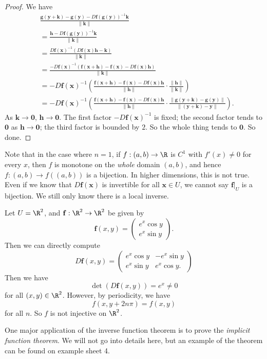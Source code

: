\documentclass[a4paper]{article}
\begin{document}
\begin{proof}
  We have
  \begin{align*}
    &\frac{\mathbf{g}(\mathbf{y} + \mathbf{k}) - \mathbf{g}(\mathbf{y}) - D \mathbf{f}(\mathbf{g}(\mathbf{y}))^{-1} \mathbf{k}}{\|\mathbf{k}\|}\\
    &= \frac{\mathbf{h} - D\mathbf{f}(\mathbf{g}(\mathbf{y}))^{-1} \mathbf{k}}{\|\mathbf{k}\|}\\
    &= \frac{D \mathbf{f}(\mathbf{x})^{-1}(D \mathbf{f}(\mathbf{x})\mathbf{h} - \mathbf{k})}{\|\mathbf{k}\|}\\
    &= \frac{-D \mathbf{f}(\mathbf{x})^{-1}(\mathbf{f}(\mathbf{x} + \mathbf{h}) - \mathbf{f}(\mathbf{x}) - D \mathbf{f}(\mathbf{x})\mathbf{h})}{\|\mathbf{k}\|}\\
    &= -D \mathbf{f}(\mathbf{x})^{-1} \left(\frac{\mathbf{f}(\mathbf{x} + \mathbf{h}) - \mathbf{f}(\mathbf{x}) - D \mathbf{f}(\mathbf{x}) \mathbf{\mathbf{h}}}{\|\mathbf{h}\|} \cdot \frac{\|\mathbf{h}\|}{\|\mathbf{k}\|}\right)\\
    &= -D \mathbf{f}(\mathbf{x})^{-1} \left(\frac{\mathbf{f}(\mathbf{x} + \mathbf{h}) - \mathbf{f}(\mathbf{x}) - D \mathbf{f}(\mathbf{x}) \mathbf{\mathbf{h}}}{\|\mathbf{h}\|} \cdot \frac{\|\mathbf{g}(\mathbf{y} + \mathbf{k}) - \mathbf{g}(\mathbf{y})\|}{\|(\mathbf{y} + \mathbf{k}) - \mathbf{y}\|}\right).
  \end{align*}
  As $\mathbf{k} \to \mathbf{0}$, $\mathbf{h} \to \mathbf{0}$. The first factor $-D \mathbf{f}(\mathbf{x})^{-1}$ is fixed; the second factor tends to $\mathbf{0}$ as $\mathbf{h} \to \mathbf{0}$; the third factor is bounded by $2$. So the whole thing tends to $\mathbf{0}$. So done.
\end{proof}
Note that in the case where $n = 1$, if $f: (a, b) \to \R$ is $C^1$ with $f'(x) \not= 0$ for every $x$, then $f$ is monotone on the \emph{whole} domain $(a, b)$, and hence $f: (a, b) \to f((a, b))$ is a bijection. In higher dimensions, this is not true. Even if we know that $D \mathbf{f}(\mathbf{x})$ is invertible for all $\mathbf{x} \in U$, we cannot say $\mathbf{f}|_U$ is a bijection. We still only know there is a local inverse.

\begin{eg}
  Let $U = \R^2$, and $\mathbf{f}: \R^2 \to \R^2$ be given by
  \[
    \mathbf{f}(x,y) =
    \begin{pmatrix}
      e^x \cos y\\
      e^x \sin y
    \end{pmatrix}.
  \]
  Then we can directly compute
  \[
    D\mathbf{f}(x, y) =
    \begin{pmatrix}
      e^x \cos y & -e^x \sin y\\
      e^x \sin y & e^x \cos y.
    \end{pmatrix}
  \]
  Then we have
  \[
    \det (D\mathbf{f}(x, y)) = e^x \not= 0
  \]
  for all $(x, y) \in \R^2$. However, by periodicity, we have
  \[
    f(x, y + 2n\pi) = f(x, y)
  \]
  for all $n$. So $f$ is not injective on $\R^2$.
\end{eg}
One major application of the inverse function theorem is to prove the \emph{implicit function theorem}. We will not go into details here, but an example of the theorem can be found on example sheet 4.
\end{document}
